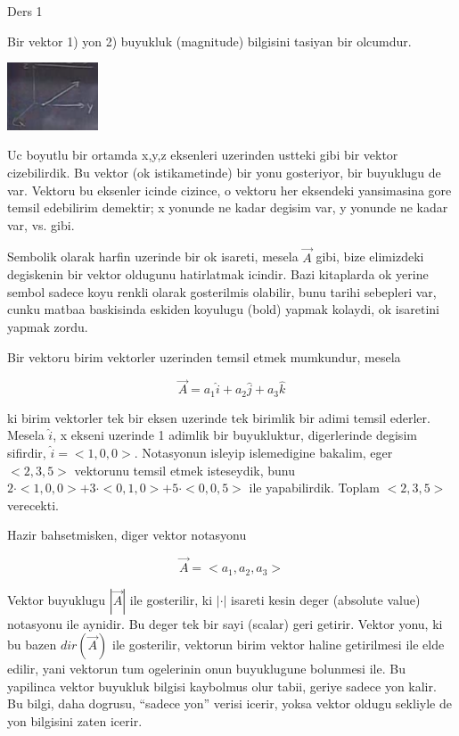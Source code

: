\documentclass[12pt,fleqn]{article}
\begin{document}
Ders 1

Bir vektor 1) yon 2) buyukluk (magnitude) bilgisini tasiyan bir olcumdur. 

\includegraphics[height=2cm]{1_1.png}

Uc boyutlu bir ortamda x,y,z eksenleri uzerinden ustteki gibi bir vektor
cizebilirdik. Bu vektor (ok istikametinde) bir yonu gosteriyor, bir
buyuklugu de var. Vektoru bu eksenler icinde cizince, o vektoru her
eksendeki yansimasina gore temsil edebilirim demektir; x yonunde ne kadar
degisim var, y yonunde ne kadar var, vs. gibi.

Sembolik olarak harfin uzerinde bir ok isareti, mesela $\vec{A}$ gibi, bize
elimizdeki degiskenin bir vektor oldugunu hatirlatmak icindir. Bazi
kitaplarda ok yerine sembol sadece koyu renkli olarak gosterilmis olabilir,
bunu tarihi sebepleri var, cunku matbaa baskisinda eskiden koyulugu (bold)
yapmak kolaydi, ok isaretini yapmak zordu. 

Bir vektoru birim vektorler uzerinden temsil etmek mumkundur, mesela 

\[ \vec{A} = a_1 \hat{i} + a_2 \hat{j} + a_3 \hat{k} \]

ki birim vektorler tek bir eksen uzerinde tek birimlik bir adimi temsil
ederler. Mesela $\hat{i}$, x ekseni uzerinde 1 adimlik bir buyukluktur,
digerlerinde degisim sifirdir, $\hat{i} = <1,0,0>$. Notasyonun isleyip
islemedigine bakalim, eger $<2,3,5>$ vektorunu temsil etmek isteseydik,
bunu $2\cdot<1,0,0> + 3\cdot<0,1,0> + 5\cdot<0,0,5>$ ile
yapabilirdik. Toplam $<2,3,5>$ verecekti. 

Hazir bahsetmisken, diger vektor notasyonu

\[ \vec{A} = <a_1, a_2, a_3> \]

Vektor buyuklugu $|\vec{A}|$ ile gosterilir, ki $|\cdot|$ isareti kesin
deger (absolute value) notasyonu ile aynidir. Bu deger tek bir sayi
(scalar) geri getirir. Vektor yonu, ki bu bazen $dir(\vec{A})$ ile
gosterilir, vektorun birim vektor haline getirilmesi ile elde edilir, yani
vektorun tum ogelerinin onun buyuklugune bolunmesi ile. Bu yapilinca vektor
buyukluk bilgisi kaybolmus olur tabii, geriye sadece yon kalir. Bu bilgi,
daha dogrusu, ``sadece yon'' verisi icerir, yoksa vektor oldugu sekliyle de
yon bilgisini zaten icerir.
\end{document}
